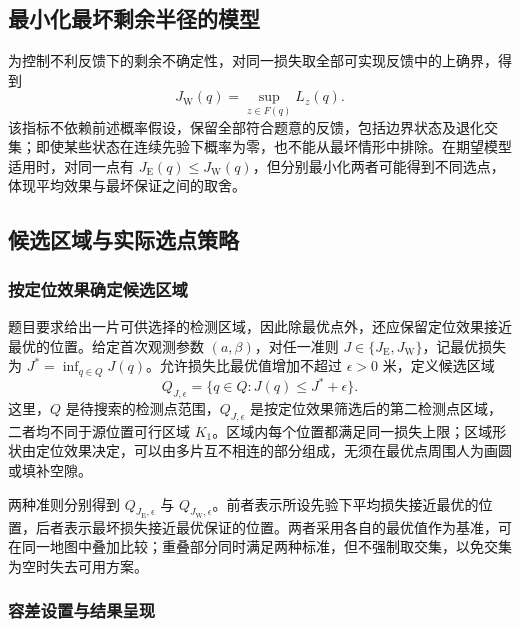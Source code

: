 \documentclass[UTF8,a4paper,zihao=-4,fontset=none]{ctexart}
\begin{document}
\subsection{最小化最坏剩余半径的模型}

为控制不利反馈下的剩余不确定性，对同一损失取全部可实现反馈中的上确界，得到
\begin{equation}
 J_{\mathrm W}(q)=\sup_{z\in F(q)}L_z(q).
\label{eq:q2-pair-worst-objective}
\end{equation}
该指标不依赖前述概率假设，保留全部符合题意的反馈，包括边界状态及退化交集；即使某些状态在连续先验下概率为零，也不能从最坏情形中排除。在期望模型适用时，对同一点有 \(J_{\mathrm E}(q)\le J_{\mathrm W}(q)\)，但分别最小化两者可能得到不同选点，体现平均效果与最坏保证之间的取舍。

\subsection{候选区域与实际选点策略}

\subsubsection{按定位效果确定候选区域}

题目要求给出一片可供选择的检测区域，因此除最优点外，还应保留定位效果接近最优的位置。给定首次观测参数 \((a,\beta)\)，对任一准则 \(J\in\{J_{\mathrm E},J_{\mathrm W}\}\)，记最优损失为 \(J^*=\inf_{q\in Q}J(q)\)。允许损失比最优值增加不超过 \(\epsilon>0\) 米，定义候选区域
\begin{equation}
 Q_{J,\epsilon}=\{q\in Q:J(q)\le J^*+\epsilon\}.
 \label{eq:q2-candidate-region}
\end{equation}
这里，\(Q\) 是待搜索的检测点范围，\(Q_{J,\epsilon}\) 是按定位效果筛选后的第二检测点区域，二者均不同于源位置可行区域 \(K_1\)。区域内每个位置都满足同一损失上限；区域形状由定位效果决定，可以由多片互不相连的部分组成，无须在最优点周围人为画圆或填补空隙。

两种准则分别得到 \(Q_{J_{\mathrm E},\epsilon}\) 与 \(Q_{J_{\mathrm W},\epsilon}\)。前者表示所设先验下平均损失接近最优的位置，后者表示最坏损失接近最优保证的位置。两者采用各自的最优值作为基准，可在同一地图中叠加比较；重叠部分同时满足两种标准，但不强制取交集，以免交集为空时失去可用方案。

\subsubsection{容差设置与结果呈现}
\end{document}
